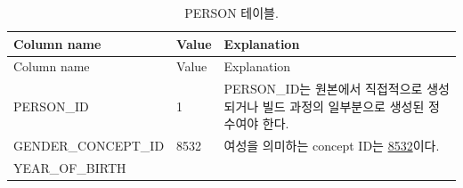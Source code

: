 \documentclass[11pt]{book}
\theoremstyle{definition}
\theoremstyle{definition}
\theoremstyle{definition}
\theoremstyle{remark}
\begin{document}
\begin{longtable}[]{@{}lll@{}}
\caption{\label{tab:person} PERSON 테이블.}\tabularnewline
\toprule
\begin{minipage}[b]{0.28\columnwidth}\raggedright\strut
Column name\strut
\end{minipage} & \begin{minipage}[b]{0.16\columnwidth}\raggedright\strut
Value\strut
\end{minipage} & \begin{minipage}[b]{0.48\columnwidth}\raggedright\strut
Explanation\strut
\end{minipage}\tabularnewline
\midrule
\endfirsthead
\toprule
\begin{minipage}[b]{0.28\columnwidth}\raggedright\strut
Column name\strut
\end{minipage} & \begin{minipage}[b]{0.16\columnwidth}\raggedright\strut
Value\strut
\end{minipage} & \begin{minipage}[b]{0.48\columnwidth}\raggedright\strut
Explanation\strut
\end{minipage}\tabularnewline
\midrule
\endhead
\begin{minipage}[t]{0.28\columnwidth}\raggedright\strut
PERSON\_ID\strut
\end{minipage} & \begin{minipage}[t]{0.16\columnwidth}\raggedright\strut
1\strut
\end{minipage} & \begin{minipage}[t]{0.48\columnwidth}\raggedright\strut
PERSON\_ID는 원본에서 직접적으로 생성되거나 빌드 과정의 일부분으로
생성된 정수여야 한다.\strut
\end{minipage}\tabularnewline
\begin{minipage}[t]{0.28\columnwidth}\raggedright\strut
GENDER\_CONCEPT\_ID\strut
\end{minipage} & \begin{minipage}[t]{0.16\columnwidth}\raggedright\strut
8532\strut
\end{minipage} & \begin{minipage}[t]{0.48\columnwidth}\raggedright\strut
여성을 의미하는 concept ID는
\href{http://athena.ohdsi.org/search-terms/terms/8532}{8532}이다.\strut
\end{minipage}\tabularnewline
\begin{minipage}[t]{0.28\columnwidth}\raggedright\strut
YEAR\_OF\_BIRTH\strut
\end{minipage} & \begin{minipage}[t]{0.16\columnwidth}\raggedright\strut

\end{minipage}
\end{longtable}
\end{document}
